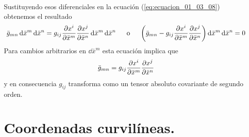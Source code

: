\documentclass[hidelinks,12pt]{article}
\begin{document}
Sustituyendo esos diferenciales en la ecuación (\ref{eq:ecuacion_01_03_08}) obtenemos el resultado
\begin{align*}
    \bar{g}_{mn} \dd{\bar{x}^{m}} \dd{\bar{x}^{n}} = g_{ij} \pdv{x^{i}}{\bar{x}^{m}} \pdv{x^{j}}{\bar{x}^{n}} \dd{\bar{x}^{m}} \dd{\bar{x}^{n}} \hspace{0.5cm} \text{o} \hspace{0.5cm} \left( \bar{g}_{mn} - g_{ij} \pdv{x^{i}}{\bar{x}^{m}} \pdv{x^{j}}{\bar{x}^{n}} \right) \dd{\bar{x}^{m}} \dd{\bar{x}^{n}} = 0
\end{align*}
Para cambios arbitrarios en $\dd{\bar{x}^{m}}$ esta ecuación implica que
\begin{align*}
    \bar{g}_{mn} = g_{ij} \pdv{x^{i}}{\bar{x}^{m}} \pdv{x^{j}}{\bar{x}^{n}}
\end{align*}
y en consecuencia $g_{ij}$ transforma como un tensor absoluto covariante de segundo orden.

\section{Coordenadas curvilíneas.}
\end{document}

